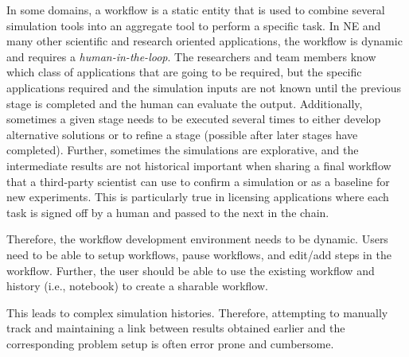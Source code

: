 In some domains, a workflow is a static entity that is used to combine
several simulation tools into an aggregate tool to perform a specific
task. In NE and many other scientific and research oriented
applications, the workflow is dynamic and requires a {\em
  human-in-the-loop}. The researchers and team members know which class of applications
that are going to be required, but the specific applications required
and the simulation inputs are not known until the previous stage is
completed and the human can evaluate the output. Additionally,
sometimes a given stage needs to be executed several times to either
develop alternative solutions or to refine a stage (possible after
later stages have completed). Further, sometimes the simulations are
explorative, and the intermediate results are not historical important
when sharing a final workflow that a third-party scientist can use to
confirm a simulation or as a baseline for new experiments. This is particularly true in licensing applications where each task is signed off by a human and passed to the next in the chain.

Therefore, the workflow development environment needs to be
dynamic. Users need to be able to setup workflows, pause workflows,
and edit/add steps in the workflow. Further, the user should be able
to use the existing workflow and history (i.e., notebook) to create a
sharable workflow.

This leads to complex simulation 
histories. Therefore, attempting to manually track and maintaining a link between results obtained earlier and the 
corresponding problem setup is often error prone and cumbersome.



